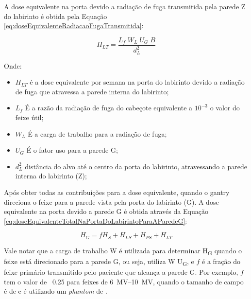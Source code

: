 \documentclass[11pt,a4paper]{article}
\newcounter{exemplo}
\begin{document}
            A dose equivalente na porta devido a radiação de fuga transmitida pela parede Z do labirinto é obtida pela Equação \ref{eq:doseEquivalenteRadiacaoFugaTransmitida}:

                \begin{equation}
                    H_{LT} = \frac{L_f \; W_L \; U_G \; B}{d_L^2}
                    \label{eq:doseEquivalenteRadiacaoFugaTransmitida}
                \end{equation}

            Onde:

                \begin{itemize}
                    \item $H_{LT}$ é a dose equivalente por semana na porta do labirinto devido a radiação de fuga que atravessa a parede interna do labirinto;
                    \item $L_f$ É a razão da radiação de fuga do cabeçote equivalente a $10^{-3}$ o valor do feixe útil;
                    \item $W_L$ É a carga de trabalho para a radiação de fuga; 
                    \item $U_G$ É o fator uso para a parede G;
                    \item $d_L^2$ distância do alvo até o centro da porta do labirinto, atravessando a parede interna do labirinto (Z);
                \end{itemize}
            
            Após obter todas as contribuições para a dose equivalente, quando o gantry direciona o feixe para a parede vista pela porta do labirinto (G). A dose equivalente na porta devido a parede G é obtida através da Equação \ref{eq:doseEquivalenteTotalNaPortaDoLabirintoParaAParedeG}:

                \begin{equation}
                    H_G = f H_S + H_{LS} + H_{PS} + H_{LT}
                    \label{eq:doseEquivalenteTotalNaPortaDoLabirintoParaAParedeG}
                \end{equation}

            Vale notar que a carga de trabalho W é utilizada para determinar H\textsubscript{G} quando o feixe está direcionado para a parede G, ou seja, utiliza W U\textsubscript{G}, e $f$ é a fração do feixe primário transmitido pelo paciente que alcança a parede G. Por exemplo, $f$ tem  o valor de ~0.25 para feixes de \qtyrange{6}{10}{MV}, quando o tamanho de campo é de  e é utilizado um \textit{phantom} de .
                
\end{document}
